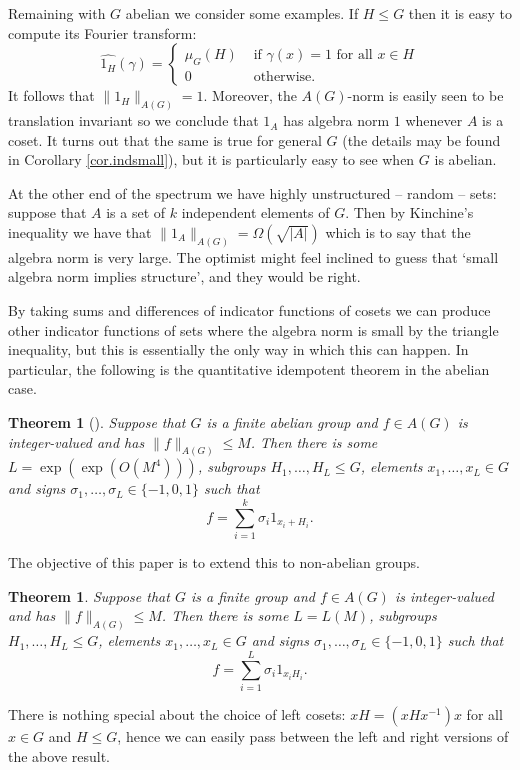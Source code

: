 \documentclass[12pt]{amsart}
\numberwithin{equation}{section}
\theoremstyle{plain}
\newtheorem{theorem}[subsection]{Theorem}
\theoremstyle{definition}
\renewcommand{\leq}{\leqslant}
\newcommand{\wh}{\widehat}
\begin{document}
Remaining with $G$ abelian we consider some examples.  If $H \leq G$ then it is easy to compute its Fourier transform:
\begin{equation*}
\wh{1_H}(\gamma)=\begin{cases} \mu_G(H) & \textrm{ if } \gamma(x)=1 \textrm{ for all }x \in H\\ 0 & \textrm{ otherwise.} \end{cases}
\end{equation*}
It follows that $\|1_H\|_{A(G)} =1$.  Moreover, the $A(G)$-norm is easily seen to be translation invariant so we conclude that $1_{A}$ has algebra norm $1$ whenever $A$ is a coset.  It turns out that the same is true for general $G$ (the details may be found in Corollary \ref{cor.indsmall}), but it is particularly easy to see when $G$ is abelian.

At the other end of the spectrum we have highly unstructured -- random -- sets: suppose that $A$ is a set of $k$ independent elements of $G$.  Then by Kinchine's inequality we have that $\|1_A\|_{A(G)} = \Omega(\sqrt{|A|})$ which is to say that the algebra norm is very large.  The optimist might feel inclined to guess that `small algebra norm implies structure', and they would be right.

By taking sums and differences of indicator functions of cosets we can produce other indicator functions of sets where the algebra norm is small by the triangle inequality, but this is essentially the only way in which this can happen.  In particular, the following is the quantitative idempotent theorem in the abelian case.
\begin{theorem}[{\cite[Theorem 1.3]{BJGTS2}}]\label{thm.green}
Suppose that $G$ is a finite abelian group and $f\in A(G)$ is integer-valued and has $\|f\|_{A(G)} \leq M$. Then there is some $L= \exp(\exp(O(M^4)))$, subgroups $H_1,\dots,H_{L} \leq G$, elements $x_1,\dots,x_{L} \in G$ and signs $\sigma_1,\dots,\sigma_L\in \{-1,0,1\}$ such that
\begin{equation*}
f = \sum_{i=1}^k{\sigma_i1_{x_i+H_i}}.
\end{equation*}
\end{theorem}
The objective of this paper is to extend this to non-abelian groups.
\begin{theorem}\label{thm.main}
Suppose that $G$ is a finite group and $f\in A(G)$ is integer-valued and has $\|f\|_{A(G)} \leq M$. Then there is some $L=L(M)$, subgroups $H_1,\dots,H_{L} \leq G$, elements $x_1,\dots,x_{L} \in G$ and signs $\sigma_1,\dots,\sigma_L\in \{-1,0,1\}$ such that
\begin{equation*}
f = \sum_{i=1}^L{\sigma_i1_{x_iH_i}}.
\end{equation*}
\end{theorem}
There is nothing special about the choice of left cosets: $xH=(xHx^{-1})x$ for all $x \in G$ and $H \leq G$, hence we can easily pass between the left and right versions of the above result.
\end{document}
